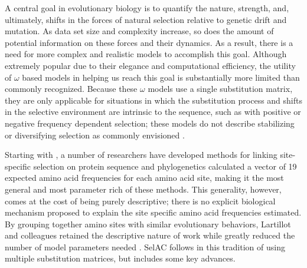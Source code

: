 \documentclass[12pt,letterpaper,fleqn]{article}
\newcommand{\selac}{SelAC\xspace}
\begin{document}
A central goal in evolutionary biology is to quantify the nature, strength, and, ultimately, shifts in the forces of natural selection relative to genetic drift and mutation.
As data set size and complexity increase, so does the amount of potential information on these forces and their dynamics.
As a result, there is a need for more complex and realistic models \citep{GoldmanEtAl1996,ThorneEtAl1996,GoldmanEtAl1998,HalpernAndBruno1998,LartillotAndPhilippe2004} to accomplish this goal.
Although extremely popular due to their elegance and computational efficiency, the utility of $\omega$ based models in helping us reach this goal is substantially more limited than commonly recognized.
Because these $\omega$ models use a single substitution matrix, they are only applicable for situations in which the substitution process and shifts in the selective environment are intrinsic to the sequence, such as with positive or negative frequency dependent selection; these models do not describe stabilizing or diversifying selection as commonly envisioned \citep{Endler1986a,Pelmyr2002}.

Starting with \citet{HalpernAndBruno1998}, a number of researchers have developed methods for linking site-specific selection on protein sequence and phylogenetics \citep[e.g.~][]{KoshiEtAl1999,DimmicEtAl2000,KoshiAndGoldstein2001,RobinsonEtAl2003,LartillotAndPhilippe2004,ThorneEtAl2012,RodrigueAndLartillot2014}
\citet{HalpernAndBruno1998} calculated  a vector of 19 expected amino acid frequencies for each amino acid site, making it the most general and most parameter rich of these methods.
This generality, however, comes at the cost of being purely descriptive; there is no explicit biological mechanism proposed to explain the site specific amino acid frequencies estimated.
By grouping together amino sites with similar evolutionary behaviors, Lartillot and colleagues retained the descriptive nature of \citet{HalpernAndBruno1998} work while greatly reduced the number of model parameters needed \citep{LartillotAndPhilippe2004,RodrigueAndLartillot2014}.
\selac follows in this tradition of using multiple substitution matrices, but includes some key advances.
\end{document}
